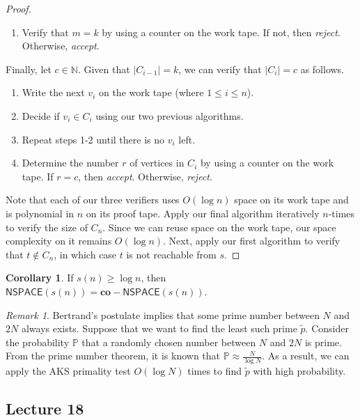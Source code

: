 \documentclass[10pt,letterpaper,cm]{nupset}
\theoremstyle{definition}
\theoremstyle{theorem}
\newtheorem{corollary}[definition]{Corollary}
\theoremstyle{remark}
\newtheorem{remark}[definition]{Remark}
\newcommand{\N}{\mathbb N}
\newcommand{\1}{\mathbf{1}}
\newcommand{\0}{\vec 0}
\begin{document}
\begin{proof}
\begin{enumerate}
\item Verify that $m = k$ by using a counter on the work tape. If not, then \textit{reject}. Otherwise, \textit{accept}.
\end{enumerate}
Finally, let $c\in \N$. Given that $|C_{i-1}|=k$, we can verify that $|C_i| = c$ as follows. 
\begin{enumerate} 
\item Write the next $v_i$ on the work tape (where $1\leq i \leq n$). 
\item Decide if $v_i \in C_i$ using our two previous algorithms.
\item Repeat steps 1-2 until there is no $v_i$ left.
\item Determine the number $r$ of vertices in $C_i$ by using a counter on the work tape. If $r = c$, then \textit{accept}. Otherwise, \textit{reject}.
\end{enumerate}
Note that each of our three verifiers uses $O(\log{n})$ space on its work tape and  is polynomial in $n$ on its proof tape. Apply our final algorithm iteratively $n$-times to verify the size of  $C_n$. Since we can reuse space on the work tape, our space complexity on it remains $O(\log{n})$.  Next, apply our first algorithm to verify that $t\notin C_n$, in which case $t$ is not reachable from $s$.
\end{proof}

\begin{corollary}
If $s(n) \geq \log{n}$, then $\mathsf{NSPACE}(s(n)) = \mathbf{co}{-}\mathsf{NSPACE}(s(n))$.
\end{corollary}

\begin{remark}
Bertrand's postulate implies that some prime number between $N$ and $2N$ always exists.  Suppose that we want to find the least such prime $\tilde{p}$. Consider the probability $\mathbb{P}$ that a randomly chosen number between $N$ and $2N$ is prime. From the prime number theorem, it is known that $\mathbb{P} \approx \frac{N}{\log{N}}$. As a result, we can apply the AKS primality test $O(\log{N})$ times to find $\tilde{p}$ with high probability.
\end{remark}

\subsection{Lecture 18}
\end{document}
